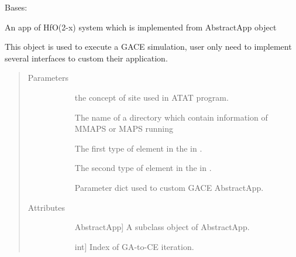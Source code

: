 \documentclass[letterpaper,10pt,english]{sphinxmanual}
\begin{document}
\begin{fulllineitems}
\label{\detokenize{pygace.examples.hfo2:pygace.examples.hfo2.hfo2_gace.HFO2App}}
Bases: {\hyperref[\detokenize{pygace:pygace.gace.AbstractApp}]{}}

An app of HfO(2-x) system which is implemented from AbstractApp object

This object is used to execute a GACE simulation, user only need to
implement several interfaces to custom their application.
\begin{quote}\begin{description}
\item[{Parameters}] \leavevmode\begin{description}
\item[{}] \leavevmode
the concept of site used in ATAT program.

\item[{}] \leavevmode
The name of a directory which contain information of MMAPS or MAPS
running

\item[{}] \leavevmode
The first type of element in the  in .

\item[{}] \leavevmode
The second type of element in the  in .

\item[{}] \leavevmode
Parameter dict used to custom GACE AbstractApp.

\end{description}

\item[{Attributes}] \leavevmode\begin{description}
\item[{}] \leavevmode{[}AbstractApp{]}
A subclass object of AbstractApp.

\item[{}] \leavevmode{[}int{]}
Index of GA-to-CE iteration.


\end{description}
\end{description}
\end{quote}
\end{fulllineitems}
\end{document}
